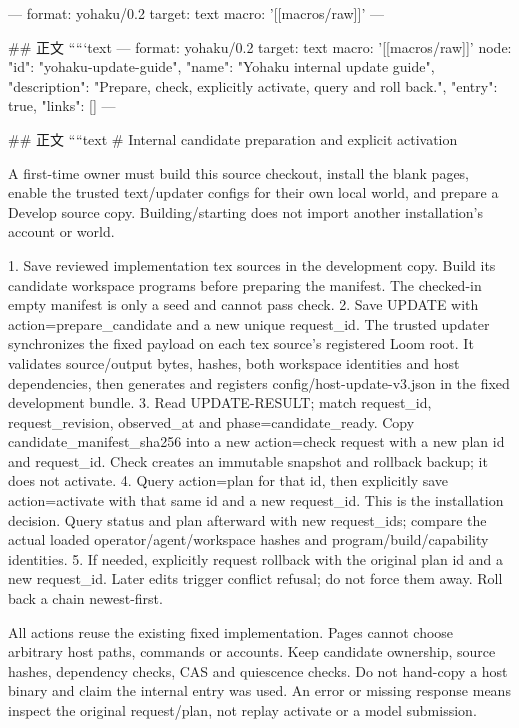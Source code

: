 ---
format: yohaku/0.2
target: text
macro: '[[macros/raw]]'
---

## 正文
`````text
---
format: yohaku/0.2
target: text
macro: '[[macros/raw]]'
node: {"id": "yohaku-update-guide", "name": "Yohaku internal update guide", "description": "Prepare, check, explicitly activate, query and roll back.", "entry": true, "links": []}
---

## 正文
````text
# Internal candidate preparation and explicit activation

A first-time owner must build this source checkout, install the blank pages, enable the trusted text/updater configs for their own local world, and prepare a Develop source copy. Building/starting does not import another installation's account or world.

1. Save reviewed implementation tex sources in the development copy. Build its candidate workspace programs before preparing the manifest. The checked-in empty manifest is only a seed and cannot pass check.
2. Save UPDATE with action=prepare_candidate and a new unique request_id. The trusted updater synchronizes the fixed payload on each tex source's registered Loom root. It validates source/output bytes, hashes, both workspace identities and host dependencies, then generates and registers config/host-update-v3.json in the fixed development bundle.
3. Read UPDATE-RESULT; match request_id, request_revision, observed_at and phase=candidate_ready. Copy candidate_manifest_sha256 into a new action=check request with a new plan id and request_id. Check creates an immutable snapshot and rollback backup; it does not activate.
4. Query action=plan for that id, then explicitly save action=activate with that same id and a new request_id. This is the installation decision. Query status and plan afterward with new request_ids; compare the actual loaded operator/agent/workspace hashes and program/build/capability identities.
5. If needed, explicitly request rollback with the original plan id and a new request_id. Later edits trigger conflict refusal; do not force them away. Roll back a chain newest-first.

All actions reuse the existing fixed implementation. Pages cannot choose arbitrary host paths, commands or accounts. Keep candidate ownership, source hashes, dependency checks, CAS and quiescence checks. Do not hand-copy a host binary and claim the internal entry was used. An error or missing response means inspect the original request/plan, not replay activate or a model submission.

